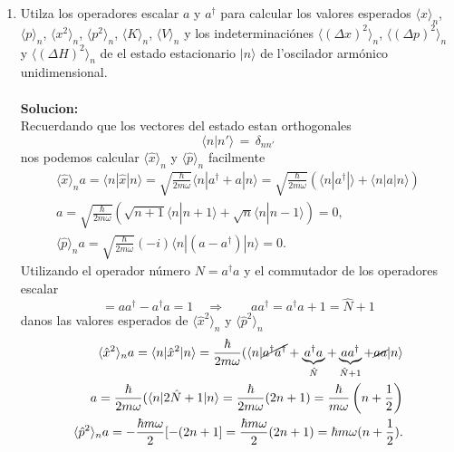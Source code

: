 \begin{enumerate}
\item Utilza los operadores escalar $a$ y $a^\dagger$ para calcular los valores
esperados $\langle x \rangle_n$, $\langle p \rangle_n$, $\langle x^2 \rangle_n$,
$\langle p^2 \rangle_n$, $\langle K \rangle_n$, $\langle V \rangle_n$ y los
indeterminaciónes $\langle (\Delta x)^2 \rangle_n$, $\langle(\Delta p)^2\rangle_n$ y
$\langle(\Delta H)^2\rangle_n$ de el estado
estacionario $|n\rangle$ de l'oscilador armónico unidimensional. \\\\
\textbf{Solucion:}\\
Recuerdando que los vectores del estado estan orthogonales
\begin{equation*}
	\langle n | n' \rangle \,=\, \delta_{nn'}
\end{equation*}
nos podemos calcular $\langle \hat x \rangle_n$ y $\langle \hat p \rangle_n$
facilmente 
\begin{align*}
	\langle \hat x \rangle_n a= \langle n | \hat x | n \rangle =
\sqrt{\frac{\hbar}{2m\omega}} \langle n| a^\dagger + a | n \rangle 
	= \sqrt{\frac{\hbar}{2m\omega}} (\langle n | a^\dagger | \rangle +
\langle n | a | n \rangle ) \\
	a = \sqrt{\frac{\hbar}{2m\omega}} (\sqrt{n+1} \langle
n| n+1\rangle + \sqrt{n} \langle n|n-1\rangle) = 0,\\
	\langle \hat p \rangle_n a= \sqrt{\frac{\hbar}{2m\omega}} (-i) \langle n |
(a - a^\dagger) | n \rangle = 0.
\end{align*}
Utilizando el operador número $N = a^\dagger a$ y el commutador de los
operadores escalar
\begin{equation*}
	[a, a^\dagger] = aa^\dagger - a^\dagger a = 1 \quad \Rightarrow \qquad a
a^\dagger = a^\dagger a + 1 = \hat N + 1	
\end{equation*}
danos las valores esperados de $\langle \hat x^2 \rangle_n$ y $\langle \hat p^2
\rangle_n$
\begin{align*}
	\langle \hat x^2 \rangle_n a= \langle n | \hat x^2 | n \rangle =
\frac{\hbar}{2m\omega} (\langle n | \cancel{a^\dagger a^\dagger} +
\underbrace{a^\dagger a}_{\hat N} + \underbrace{aa^\dagger}_{\hat N + 1} +
\cancel{aa} | n\rangle  \\
	a= \frac{\hbar}{2m\omega} (\langle n | 2 \hat N + 1 | n \rangle =
\frac{\hbar}{2m\omega} (2n +1) = \frac{\hbar}{m\omega}
\left(n+\frac{1}{2}\right) \\
	\langle \hat p^2 \rangle_n a= -\frac{\hbar m \omega}{2} [-(2n +1] =
\frac{\hbar m \omega}{2} (2n + 1) = \hbar m \omega (n + \frac{1}{2}).	

\end{align*}
\end{enumerate}
